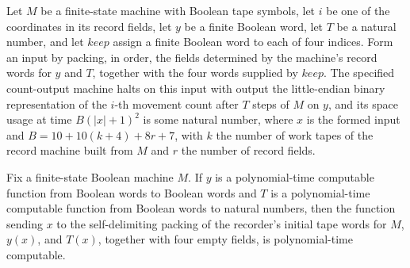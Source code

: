 \begin{lemma}
\label{Complexity.clCountOutput_quadratic}
\leanok
{}
Let $M$ be a finite-state machine with Boolean tape symbols, let $i$ be one of the
coordinates in its record fields, let $y$ be a finite Boolean word, let $T$ be a natural
number, and let $keep$ assign a finite Boolean word to each of four indices. Form an
input by packing, in order, the fields determined by the machine's record words for $y$
and $T$, together with the four words supplied by $keep$. The specified count-output
machine halts on this input with output the little-endian binary representation of the
$i$-th movement count after $T$ steps of $M$ on $y$, and its space usage at time
$B(|x|+1)^2$ is some natural number, where $x$ is the formed input and
$B=10+10(k+4)+8r+7$, with $k$ the number of work tapes of the record machine built from
$M$ and $r$ the number of record fields.
\end{lemma}

\begin{lemma}
\label{Complexity.clRecordWords_native}
\leanok
{}
Fix a finite-state Boolean machine $M$. If $y$ is a polynomial-time computable function
from Boolean words to Boolean words and $T$ is a polynomial-time computable function
from Boolean words to natural numbers, then the function sending $x$ to the
self-delimiting packing of the recorder's initial tape words for $M$, $y(x)$, and
$T(x)$, together with four empty fields, is polynomial-time computable.
\end{lemma}

